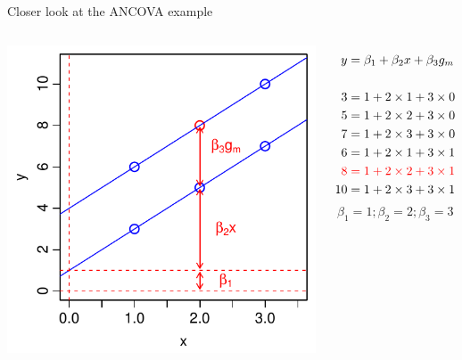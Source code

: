 \documentclass[xcolor=x11names,handout,compress]{beamer}
\renewcommand{\(}{\begin{columns}}
\renewcommand{\)}{\end{columns}}
\newcommand{\<}[1]{\begin{column}{#1}}
\renewcommand{\>}{\end{column}}
\begin{document}
\begin{frame}{Closer look at the ANCOVA example}

    \begin{columns}[T]
    
            \includegraphics[width=\textwidth]{TwoVarsHighlight.pdf}
            
                \begin{align*}
                  y  &= \beta_1  + \beta_2 x + \beta_3 g_m\\
                  \\
                  3   & = 1 + 2 \times 1 + 3 \times 0\\
                  5   & = 1 + 2 \times 2 + 3 \times 0\\
                  7   & = 1 + 2 \times 3 + 3 \times 0\\
                  6   & = 1 + 2 \times 1 + 3 \times 1\\  
                  {\color{red}8} & {\color{red}\;= 1 + 2 \times 2 + 3 \times 1}\\ %
                  10  & = 1 + 2 \times 3 + 3 \times 1
                \end{align*}
                \[\beta_1 = 1; \beta_2=2; \beta_3=3\]
    \end{columns}
    \end{frame}
    
\end{document}
